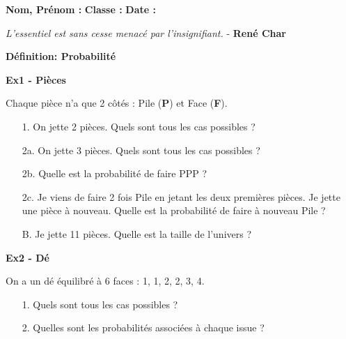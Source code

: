 



\textbf{Nom, Prénom :} \hspace{8cm} \textbf{Classe :} \hspace{3cm} \textbf{Date :}\\

\begin{center}
  \textit{L’essentiel est sans cesse menacé par l’insignifiant.} - \textbf{René Char}
\end{center}

\textbf{Définition: Probabilité} \\ \Pointilles[2]

\textbf{Ex1 - Pièces}

Chaque pièce n'a que 2 côtés : Pile (\textbf{P}) et Face (\textbf{F}).

\begin{enumerate}
  \item[1.] On jette 2 pièces. Quels sont tous les cas possibles ? \\\Pointilles[2]
  \item[2a.] On jette 3 pièces. Quels sont tous les cas possibles ? \\\Pointilles[3]
  \item[2b.] Quelle est la probabilité de faire PPP ?  \\\Pointilles[2]
  \item[2c.] Je viens de faire 2 fois Pile en jetant les deux premières pièces. Je jette une pièce à nouveau. Quelle est la probabilité de faire à nouveau Pile ? \\\Pointilles[1]
  \item[B.] Je jette 11 pièces. Quelle est la taille de l'univers ? \\\Pointilles[2]
\end{enumerate}  

\textbf{Ex2 - Dé}

On a un dé équilibré à 6 faces : 1, 1, 2, 2, 3, 4.

\begin{enumerate}
  \item[1.] Quels sont tous les cas possibles ? \\ \Pointilles[2]
  \item[2.] Quelles sont les probabilités associées à chaque issue ? \\ \Pointilles[2]
\end{enumerate}  

\newpage

